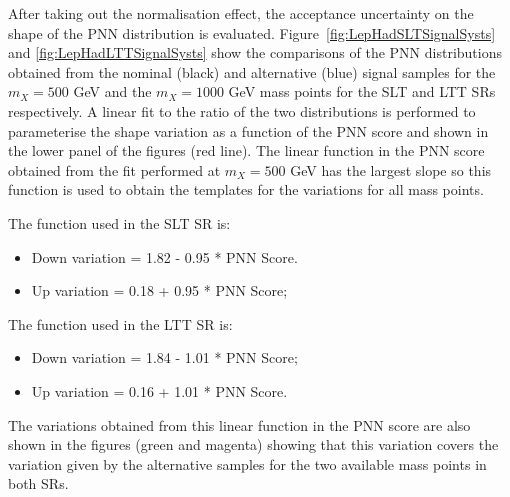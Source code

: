After taking out the normalisation effect, the acceptance uncertainty on the shape of the PNN distribution is evaluated. Figure~\ref{fig:LepHadSLTSignalSysts} and \ref{fig:LepHadLTTSignalSysts} show the comparisons of the PNN distributions obtained from the nominal (black) and alternative (blue) signal samples for the  $m_X= 500$ GeV and the $m_X=1000$ GeV mass points for the SLT and LTT SRs respectively. A linear fit to the ratio of the two distributions is performed to parameterise the shape variation as a function of the PNN score and shown in the lower panel of the figures (red line). The linear function in the PNN score obtained from the fit performed at $m_X= 500$ GeV has the largest slope so this function is used to obtain the templates for the variations for all mass points. 

The function used in the SLT SR is:

\begin{itemize}
\item Down variation = 1.82 - 0.95 * PNN Score.
\item Up variation = 0.18 + 0.95 * PNN Score;
\end{itemize}

The function used in the LTT SR is:

\begin{itemize}
\item Down variation = 1.84 - 1.01 * PNN Score;
\item Up variation = 0.16 + 1.01 * PNN Score.
\end{itemize}

The variations obtained from this linear function in the PNN score are also shown in the figures (green and magenta) showing that this variation covers the variation given by the alternative samples for the two available mass points in both SRs.

